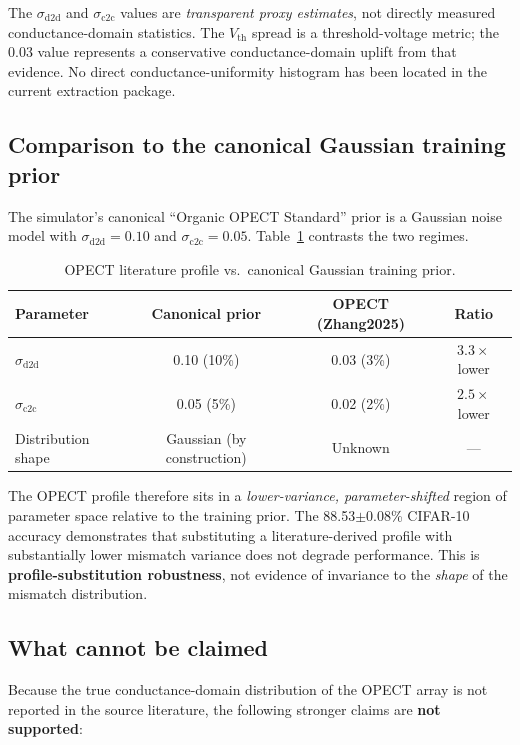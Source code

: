 The $\sigma_{\text{d2d}}$ and $\sigma_{\text{c2c}}$ values are \emph{transparent proxy estimates}, not directly measured conductance-domain statistics. The $V_{\text{th}}$ spread is a threshold-voltage metric; the 0.03 value represents a conservative conductance-domain uplift from that evidence. No direct conductance-uniformity histogram has been located in the current extraction package.

\subsection{Comparison to the canonical Gaussian training prior}

The simulator's canonical ``Organic OPECT Standard'' prior is a Gaussian noise model with $\sigma_{\text{d2d}}=0.10$ and $\sigma_{\text{c2c}}=0.05$. Table~\ref{tab:opect-vs-canonical} contrasts the two regimes.

\begin{table}[ht]
\centering
\caption{OPECT literature profile vs.~canonical Gaussian training prior.}
\label{tab:opect-vs-canonical}
\begin{tabular}{@{}lccc@{}}
\toprule
Parameter & Canonical prior & OPECT (Zhang2025) & Ratio \\
\midrule
$\sigma_{\text{d2d}}$ & 0.10 (10\%) & 0.03 (3\%) & $3.3\times$ lower \\
$\sigma_{\text{c2c}}$ & 0.05 (5\%) & 0.02 (2\%) & $2.5\times$ lower \\
Distribution shape & Gaussian (by construction) & Unknown & --- \\
\bottomrule
\end{tabular}
\end{table}

The OPECT profile therefore sits in a \emph{lower-variance, parameter-shifted} region of parameter space relative to the training prior. The 88.53$\pm$0.08\% CIFAR-10 accuracy demonstrates that substituting a literature-derived profile with substantially lower mismatch variance does not degrade performance. This is \textbf{profile-substitution robustness}, not evidence of invariance to the \emph{shape} of the mismatch distribution.

\subsection{What cannot be claimed}

Because the true conductance-domain distribution of the OPECT array is not reported in the source literature, the following stronger claims are \textbf{not supported}:

